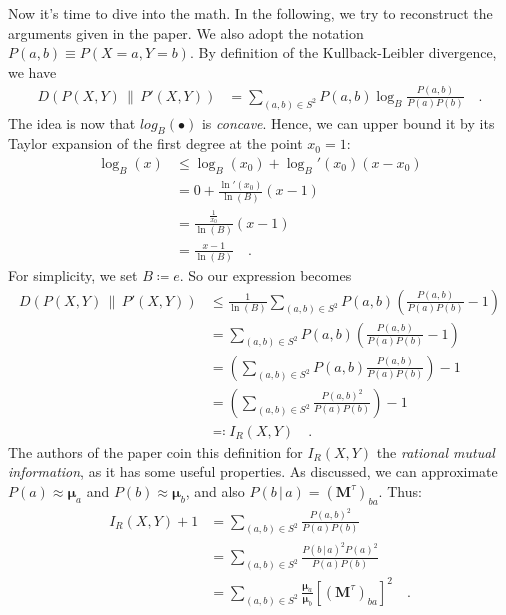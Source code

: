 \documentclass[../../main.tex]{subfiles}
\begin{document}
    \bigskip \bigskip \noindent
    Now it's time to dive into the math. In the following, we try to reconstruct the arguments given in the paper. We also adopt the notation $P (a, b) \equiv P (X = a, Y = b)$. By definition of the Kullback-Leibler divergence, we have
    \begin{align*}
        D(P(X, Y) \,\|\, P'(X, Y)) &= \sum_{(a,b) \in S^2} P(a, b) \log_B \frac{P(a, b)}{P(a) P(b)} \quad .
    \end{align*}
    The idea is now that $log_B(\bullet)$ is \emph{concave}. Hence, we can upper bound it by its Taylor expansion of the first degree at the point $x_0 = 1$:
    \begin{align*}
        \log_B(x) &\leq \log_B(x_0) + \log_B'(x_0) (x - x_0) \\
        &= 0 + \frac{\ln'(x_0)}{\ln(B)} (x - 1) \\
        &= \frac{\frac{1}{x_0}}{\ln(B)} (x - 1) \\
        &= \frac{x - 1}{\ln(B)} \quad .
    \end{align*}
    For simplicity, we set $B \coloneqq e$. So our expression becomes
    \begin{align*}
        D(P(X, Y) \,\|\, P'(X, Y)) &\leq \frac{1}{\ln(B)}\sum_{(a,b) \in S^2} P(a, b) \left( \frac{P(a, b)}{P(a) P(b)} - 1 \right) \\
        &= \sum_{(a,b) \in S^2} P(a, b) \left( \frac{P(a, b)}{P(a) P(b)} - 1 \right) \\
        &= \left( \sum_{(a,b) \in S^2} P(a, b) \frac{P(a, b)}{P(a) P(b)} \right) - 1 \\
        &= \left( \sum_{(a,b) \in S^2} \frac{P(a, b)^2}{P(a) P(b)} \right) - 1 \\
        &\eqqcolon I_R(X, Y) \quad .
    \end{align*}
    The authors of the paper coin this definition for $I_R(X, Y)$ the \emph{rational mutual information}, as it has some useful properties. As discussed, we can approximate $P(a) \approx \boldsymbol{\mu}_a$ and $P(b) \approx \boldsymbol{\mu}_b$, and also $P(b \,|\, a) = (\boldsymbol{M}^{\tau})_{ba}$. Thus:
    \begin{align*}
        I_R(X, Y) + 1 &= \sum_{(a,b) \in S^2} \frac{P(a, b)^2}{P(a) P(b)} \\
        &= \sum_{(a,b) \in S^2} \frac{P(b \,|\, a)^2 P(a)^2}{P(a) P(b)} \\
        &= \sum_{(a,b) \in S^2} \frac{\boldsymbol{\mu}_a}{\boldsymbol{\mu}_b} \left[ (\boldsymbol{M}^{\tau})_{ba} \right] ^2 \quad .
    \end{align*}
\end{document}
